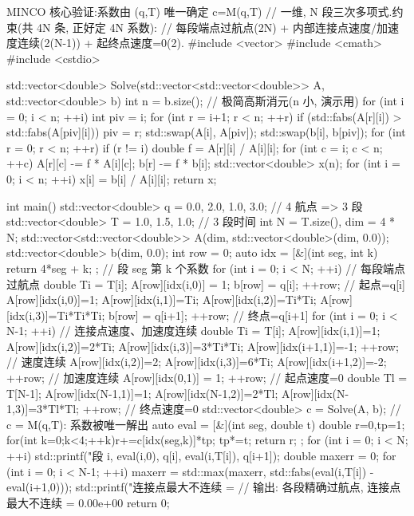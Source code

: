 \begin{codebox}[C++]{MINCO 核心验证:系数由 (q,T) 唯一确定 c=M(q,T)}
// 一维, N 段三次多项式.约束(共 4N 条, 正好定 4N 系数):
//   每段端点过航点(2N) + 内部连接点速度/加速度连续(2(N-1)) + 起终点速度=0(2).
#include <vector>
#include <cmath>
#include <cstdio>

std::vector<double> Solve(std::vector<std::vector<double>> A, std::vector<double> b) {
  int n = b.size();                                // 极简高斯消元(n 小, 演示用)
  for (int i = 0; i < n; ++i) {
    int piv = i;
    for (int r = i+1; r < n; ++r) if (std::fabs(A[r][i]) > std::fabs(A[piv][i])) piv = r;
    std::swap(A[i], A[piv]); std::swap(b[i], b[piv]);
    for (int r = 0; r < n; ++r) if (r != i) {
      double f = A[r][i] / A[i][i];
      for (int c = i; c < n; ++c) A[r][c] -= f * A[i][c];
      b[r] -= f * b[i];
    }
  }
  std::vector<double> x(n);
  for (int i = 0; i < n; ++i) x[i] = b[i] / A[i][i];
  return x;
}

int main() {
  std::vector<double> q = {0.0, 2.0, 1.0, 3.0};   // 4 航点 => 3 段
  std::vector<double> T = {1.0, 1.5, 1.0};        // 3 段时间
  int N = T.size(), dim = 4 * N;
  std::vector<std::vector<double>> A(dim, std::vector<double>(dim, 0.0));
  std::vector<double> b(dim, 0.0);
  int row = 0;
  auto idx = [&](int seg, int k){ return 4*seg + k; };  // 段 seg 第 k 个系数
  for (int i = 0; i < N; ++i) {                   // 每段端点过航点
    double Ti = T[i];
    A[row][idx(i,0)] = 1; b[row] = q[i]; ++row;                          // 起点=q[i]
    A[row][idx(i,0)]=1; A[row][idx(i,1)]=Ti; A[row][idx(i,2)]=Ti*Ti;
    A[row][idx(i,3)]=Ti*Ti*Ti; b[row] = q[i+1]; ++row;                   // 终点=q[i+1]
  }
  for (int i = 0; i < N-1; ++i) {                 // 连接点速度、加速度连续
    double Ti = T[i];
    A[row][idx(i,1)]=1; A[row][idx(i,2)]=2*Ti; A[row][idx(i,3)]=3*Ti*Ti;
    A[row][idx(i+1,1)]=-1; ++row;                                        // 速度连续
    A[row][idx(i,2)]=2; A[row][idx(i,3)]=6*Ti; A[row][idx(i+1,2)]=-2; ++row; // 加速度连续
  }
  A[row][idx(0,1)] = 1; ++row;                    // 起点速度=0
  double Tl = T[N-1];
  A[row][idx(N-1,1)]=1; A[row][idx(N-1,2)]=2*Tl; A[row][idx(N-1,3)]=3*Tl*Tl; ++row; // 终点速度=0
  std::vector<double> c = Solve(A, b);            // c = M(q,T): 系数被唯一解出
  auto eval = [&](int seg, double t){
    double r=0,tp=1; for(int k=0;k<4;++k){r+=c[idx(seg,k)]*tp; tp*=t;} return r; };
  for (int i = 0; i < N; ++i)
    std::printf("段%
                i, eval(i,0), q[i], eval(i,T[i]), q[i+1]);
  double maxerr = 0;
  for (int i = 0; i < N-1; ++i)
    maxerr = std::max(maxerr, std::fabs(eval(i,T[i]) - eval(i+1,0)));
  std::printf("连接点最大不连续 = %
  // 输出: 各段精确过航点, 连接点最大不连续 = 0.00e+00
  return 0;
}
\end{codebox}

